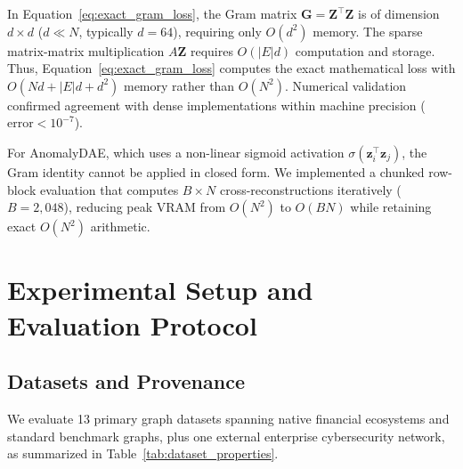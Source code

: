 \documentclass[applsci,article,submit,moreauthors,pdftex]{Definitions/mdpi}
\begin{document}
In Equation~\eqref{eq:exact_gram_loss}, the Gram matrix $\mathbf{G} = \mathbf{Z}^\top \mathbf{Z}$ is of dimension $d \times d$ ($d \ll N$, typically $d=64$), requiring only $O(d^2)$ memory. The sparse matrix-matrix multiplication $A \mathbf{Z}$ requires $O(|E|d)$ computation and storage. Thus, Equation~\eqref{eq:exact_gram_loss} computes the exact mathematical loss with $O(N d + |E| d + d^2)$ memory rather than $O(N^2)$. Numerical validation confirmed agreement with dense implementations within machine precision ($\text{error} < 10^{-7}$).

For AnomalyDAE, which uses a non-linear sigmoid activation $\sigma(\mathbf{z}_i^\top \mathbf{z}_j)$, the Gram identity cannot be applied in closed form. We implemented a chunked row-block evaluation that computes $B \times N$ cross-reconstructions iteratively ($B=2,048$), reducing peak VRAM from $O(N^2)$ to $O(B N)$ while retaining exact $O(N^2)$ arithmetic.

\section{Experimental Setup and Evaluation Protocol}
\label{sec:experimental_setup}

\subsection{Datasets and Provenance}
We evaluate 13 primary graph datasets spanning native financial ecosystems and standard benchmark graphs, plus one external enterprise cybersecurity network, as summarized in Table~\ref{tab:dataset_properties}.
\end{document}
